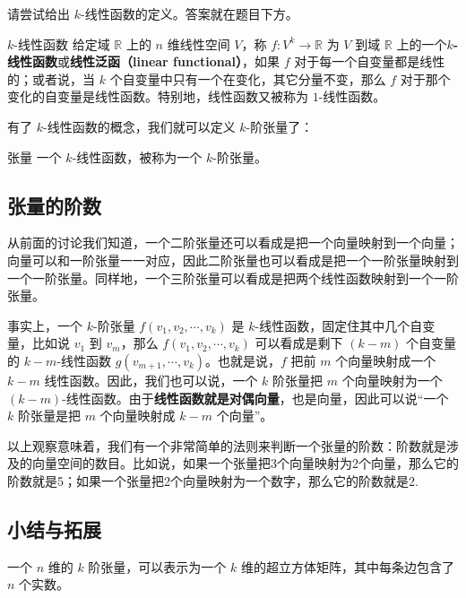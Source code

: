 \begin{exercise}{}
请尝试给出 $k$-线性函数的定义。答案就在题目下方。
\end{exercise}

\begin{definition}{$k$-线性函数}
给定域 $\mathbb{R}$ 上的 $n$ 维线性空间 $V$，称 $f:V^k\rightarrow \mathbb{R}$ 为 $V$ 到域 $\mathbb{R}$ 上的一个\textbf{$k$-线性函数}或\textbf{线性泛函（linear functional）}，如果 $f$ 对于每一个自变量都是线性的；或者说，当 $k$ 个自变量中只有一个在变化，其它分量不变，那么 $f$ 对于那个变化的自变量是线性函数。特别地，线性函数又被称为 $1$-线性函数。
\end{definition}

有了 $k$-线性函数的概念，我们就可以定义 $k$-阶张量了：

\begin{definition}{张量}
一个 $k$-线性函数，被称为一个 $k$-阶张量。
\end{definition}

\subsection{张量的阶数}

从前面的讨论我们知道，一个二阶张量还可以看成是把一个向量映射到一个向量；向量可以和一阶张量一一对应，因此二阶张量也可以看成是把一个一阶张量映射到一个一阶张量。同样地，一个三阶张量可以看成是把两个线性函数映射到一个一阶张量。

事实上，一个 $k$-阶张量 $f({v}_1, {v}_2, \cdots,{v}_k)$ 是 $k$-线性函数，固定住其中几个自变量，比如说 ${v}_1$ 到 ${v}_m$，那么 $f({v}_1, {v}_2,\cdots,{v}_k)$ 可以看成是剩下 $(k-m)$ 个自变量的 $k-m$-线性函数 $g({v}_{m+1}, \cdots,{v}_k)$。也就是说，$f$ 把前 $m$ 个向量映射成一个 $k-m$ 线性函数。因此，我们也可以说，一个 $k$ 阶张量把 $m$ 个向量映射为一个 $(k-m)$-线性函数。由于\textbf{线性函数就是对偶向量}，也是向量，因此可以说“一个 $k$ 阶张量是把 $m$ 个向量映射成 $k-m$ 个向量”。

以上观察意味着，我们有一个非常简单的法则来判断一个张量的阶数：阶数就是涉及的向量空间的数目。比如说，如果一个张量把3个向量映射为2个向量，那么它的阶数就是5；如果一个张量把2个向量映射为一个数字，那么它的阶数就是2. 

\subsection{小结与拓展}

一个 $n$ 维的 $k$ 阶张量，可以表示为一个 $k$ 维的超立方体矩阵，其中每条边包含了 $n$ 个实数。

